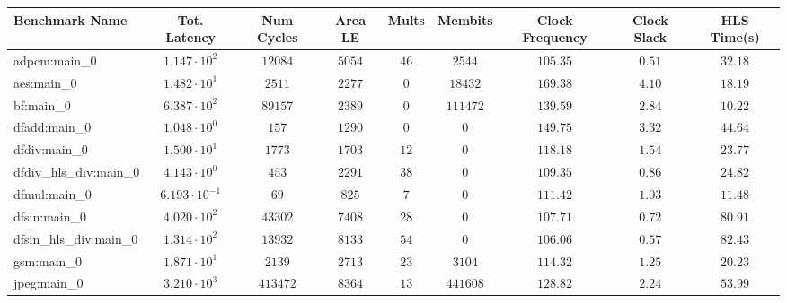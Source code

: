 \begin{tabular}{|l|c|c|c|c|c|c|c|c|}
\hline
Benchmark Name          & Tot. Latency            & Num Cycles & Area LE   & Mults   & Membits    & Clock Frequency & Clock Slack & HLS Time(s) \\
\hline
adpcm:main\_0           & $ 1.147 \cdot 10^{2}  $ & $ 12084  $ & $ 5054  $ & $ 46  $ & $ 2544   $ & $ 105.35      $ & $ 0.51    $ & $ 32.18   $ \\
aes:main\_0             & $ 1.482 \cdot 10^{1}  $ & $ 2511   $ & $ 2277  $ & $ 0   $ & $ 18432  $ & $ 169.38      $ & $ 4.10    $ & $ 18.19   $ \\
bf:main\_0              & $ 6.387 \cdot 10^{2}  $ & $ 89157  $ & $ 2389  $ & $ 0   $ & $ 111472 $ & $ 139.59      $ & $ 2.84    $ & $ 10.22   $ \\
dfadd:main\_0           & $ 1.048 \cdot 10^{0}  $ & $ 157    $ & $ 1290  $ & $ 0   $ & $ 0      $ & $ 149.75      $ & $ 3.32    $ & $ 44.64   $ \\
dfdiv:main\_0           & $ 1.500 \cdot 10^{1}  $ & $ 1773   $ & $ 1703  $ & $ 12  $ & $ 0      $ & $ 118.18      $ & $ 1.54    $ & $ 23.77   $ \\
dfdiv\_hls\_div:main\_0 & $ 4.143 \cdot 10^{0}  $ & $ 453    $ & $ 2291  $ & $ 38  $ & $ 0      $ & $ 109.35      $ & $ 0.86    $ & $ 24.82   $ \\
dfmul:main\_0           & $ 6.193 \cdot 10^{-1} $ & $ 69     $ & $ 825   $ & $ 7   $ & $ 0      $ & $ 111.42      $ & $ 1.03    $ & $ 11.48   $ \\
dfsin:main\_0           & $ 4.020 \cdot 10^{2}  $ & $ 43302  $ & $ 7408  $ & $ 28  $ & $ 0      $ & $ 107.71      $ & $ 0.72    $ & $ 80.91   $ \\
dfsin\_hls\_div:main\_0 & $ 1.314 \cdot 10^{2}  $ & $ 13932  $ & $ 8133  $ & $ 54  $ & $ 0      $ & $ 106.06      $ & $ 0.57    $ & $ 82.43   $ \\
gsm:main\_0             & $ 1.871 \cdot 10^{1}  $ & $ 2139   $ & $ 2713  $ & $ 23  $ & $ 3104   $ & $ 114.32      $ & $ 1.25    $ & $ 20.23   $ \\
jpeg:main\_0            & $ 3.210 \cdot 10^{3}  $ & $ 413472 $ & $ 8364  $ & $ 13  $ & $ 441608 $ & $ 128.82      $ & $ 2.24    $ & $ 53.99   $ \\

\end{tabular}
